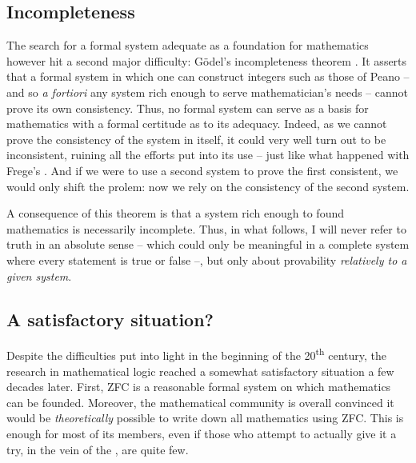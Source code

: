 \subsection{Incompleteness}

The search for a formal system adequate as a foundation for mathematics however hit a
second major difficulty: Gödel’s incompleteness theorem . It asserts
that a formal system in which one can construct integers such as those of Peano – and so
\textit{a fortiori} any system rich enough to serve mathematician’s needs – cannot
prove its own consistency.%
Thus, no formal system can serve as a basis for mathematics
with a formal certitude as to its adequacy.
Indeed, as we cannot prove the consistency of the system in itself, it could very well
turn out to be inconsistent, ruining all the efforts put into its use – just like what
happened with Frege’s . And if we were to use a second system
to prove the first consistent, we would only shift the prolem: now we rely on the
consistency of the second system.

A consequence of this theorem is that a system rich enough to found mathematics is
necessarily incomplete.%
Thus, in what follows, I will never refer to truth in an absolute sense – which could
only be meaningful in a complete system where every statement is true or false –, but
only about provability \emph{relatively to a given system}.

\subsection{A satisfactory situation?}

Despite the difficulties put into light in the beginning of the 20\textsuperscript{th}
century, the research in mathematical logic reached a somewhat satisfactory situation
a few decades later.
First, ZFC is a reasonable formal system on which mathematics can be founded. Moreover,
the mathematical community is overall convinced it would be \emph{theoretically} possible
to write down all mathematics using ZFC\@. This is enough for most of its members,
even if those who attempt to actually give it a try, in the vein of the
, are quite few.

